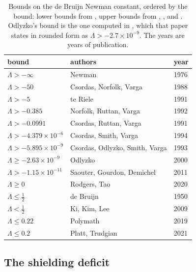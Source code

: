 \begin{table}[htbp]
\centering\small
\begin{tabular}{lll}
\toprule
bound & authors & year\\
\midrule
$\Lambda>-\infty$ & Newman & 1976\\
$\Lambda>-50$ & Csordas, Norfolk, Varga & 1988\\
$\Lambda>-5$ & te Riele & 1991\\
$\Lambda>-0.385$ & Norfolk, Ruttan, Varga & 1992\\
$\Lambda>-0.0991$ & Csordas, Ruttan, Varga & 1991\\
$\Lambda>-4.379\times10^{-6}$ & Csordas, Smith, Varga & 1994\\
$\Lambda>-5.895\times10^{-9}$ & Csordas, Odlyzko, Smith, Varga & 1993\\
$\Lambda\ge-2.63\times10^{-9}$ & Odlyzko & 2000\\
$\Lambda>-1.15\times10^{-11}$ & Saouter, Gourdon, Demichel & 2011\\
$\Lambda\ge0$ & Rodgers, Tao & 2020\\
$\Lambda\le\frac12$ & de Bruijn & 1950\\
$\Lambda<\frac12$ & Ki, Kim, Lee & 2009\\
$\Lambda\le0.22$ & Polymath & 2019\\
$\Lambda\le0.2$ & Platt, Trudgian & 2021\\
\bottomrule
\end{tabular}
\caption{Bounds on the de Bruijn Newman constant, ordered by the bound: lower bounds from \cite[Table 1]{RodgersTao}, upper bounds from \cite{deBruijn}, \cite{KKL09}, \cite{Polymath} and \cite{PT21}. Odlyzko's bound is the one computed in \cite[Section 3]{Odlyzko00}, which that paper states in rounded form as $\Lambda>-2.7\times10^{-9}$. The years are years of publication.}
\label{tab:ch21:hist}
\end{table}

\subsection{The shielding deficit}\label{nw:sec:shield}

